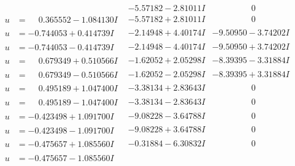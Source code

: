 \documentclass[1p]{elsarticle_modified}
\theoremstyle{definition}
\begin{document}
$$\begin{array}{c|c|c}
 & -5.57182 - 2.81011 I & \phantom{-0.000000 } 0 \\ \hline\begin{aligned}
u &= \phantom{-}0.365552 - 1.084130 I\end{aligned}
 & -5.57182 + 2.81011 I & \phantom{-0.000000 } 0 \\ \hline\begin{aligned}
u &= -0.744053 + 0.414739 I\end{aligned}
 & -2.14948 + 4.40174 I & -9.50950 - 3.74202 I \\ \hline\begin{aligned}
u &= -0.744053 - 0.414739 I\end{aligned}
 & -2.14948 - 4.40174 I & -9.50950 + 3.74202 I \\ \hline\begin{aligned}
u &= \phantom{-}0.679349 + 0.510566 I\end{aligned}
 & -1.62052 + 2.05298 I & -8.39395 - 3.31884 I \\ \hline\begin{aligned}
u &= \phantom{-}0.679349 - 0.510566 I\end{aligned}
 & -1.62052 - 2.05298 I & -8.39395 + 3.31884 I \\ \hline\begin{aligned}
u &= \phantom{-}0.495189 + 1.047400 I\end{aligned}
 & -3.38134 + 2.83643 I & \phantom{-0.000000 } 0 \\ \hline\begin{aligned}
u &= \phantom{-}0.495189 - 1.047400 I\end{aligned}
 & -3.38134 - 2.83643 I & \phantom{-0.000000 } 0 \\ \hline\begin{aligned}
u &= -0.423498 + 1.091700 I\end{aligned}
 & -9.08228 - 3.64788 I & \phantom{-0.000000 } 0 \\ \hline\begin{aligned}
u &= -0.423498 - 1.091700 I\end{aligned}
 & -9.08228 + 3.64788 I & \phantom{-0.000000 } 0 \\ \hline\begin{aligned}
u &= -0.475657 + 1.085560 I\end{aligned}
 & -0.31884 - 6.30832 I & \phantom{-0.000000 } 0 \\ \hline\begin{aligned}
u &= -0.475657 - 1.085560 I\end{aligned}

\end{array}$$
\end{document}
